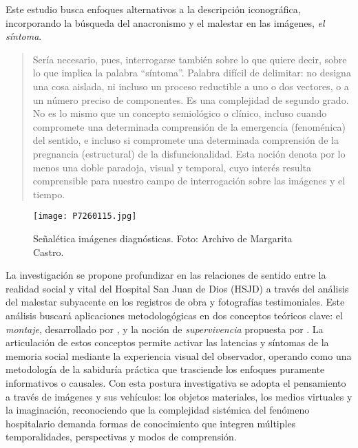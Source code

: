 Este estudio busca enfoques alternativos a la descripción iconográfica, incorporando la búsqueda del anacronismo y el malestar en las imágenes, \textit{el síntoma}.

\begin{quote}
    Sería necesario, pues, interrogarse también sobre lo que quiere decir, sobre lo que implica la palabra “síntoma”. Palabra difícil de delimitar: no designa una cosa aislada, ni incluso un proceso reductible a uno o dos vectores, o a un número preciso de componentes. Es una complejidad de segundo grado. No es lo mismo que un concepto semiológico o clínico, incluso cuando compromete una determinada comprensión de la emergencia (fenoménica) del sentido, e incluso si compromete una determinada comprensión de la pregnancia (estructural) de la disfuncionalidad. Esta noción denota por lo menos una doble paradoja, visual y temporal, cuyo interés resulta comprensible para nuestro campo de interrogación sobre las imágenes y el tiempo. \parencite[p. 63]{DidiHuberman2011}
\end{quote}

\begin{figure}[htbp]
    \centering
    \texttt{[image: P7260115.jpg]}
    \caption{Señalética imágenes diagnósticas. Foto: Archivo de Margarita Castro.}
    \label{fig:senaletica_imagenes_diagnosticas}
\end{figure}

La investigación se propone profundizar en las relaciones de sentido entre la realidad social y vital del Hospital San Juan de Dios (HSJD) a través del análisis del malestar subyacente en los registros de obra y fotografías testimoniales. Este análisis buscará aplicaciones metodologógicas en dos conceptos teóricos clave: el \textit{montaje}, desarrollado por \parencite{Benjamin2004}, y la noción de \textit{supervivencia} propuesta por \parencite{Warburg2010}. La articulación de estos conceptos permite activar las latencias y síntomas de la memoria social mediante la experiencia visual del observador, operando como una metodología de la sabiduría práctica que trasciende los enfoques puramente informativos o causales. Con esta postura investigativa se adopta el pensamiento a través de imágenes y sus vehículos: los objetos materiales, los medios virtuales y la imaginación, reconociendo que la complejidad sistémica del fenómeno hospitalario demanda formas de conocimiento que integren múltiples temporalidades, perspectivas y modos de comprensión.


